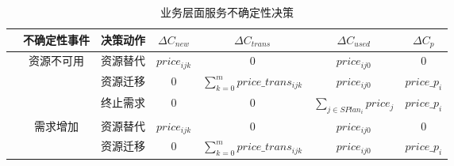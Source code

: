 \begin{table}[htbp]
    \caption{业务层面服务不确定性决策}
    \vspace{-0.5em}\label{table:state_action_business}\centering{}
    \begin{threeparttable}
        \begin{tabular}{lllllll}
            \toprule
            & \multicolumn{1}{c}{不确定性事件} 
            & \multicolumn{1}{c}{{决策动作}} 
            & \multicolumn{1}{c}{$\Delta C_{new}$} 
            & \multicolumn{1}{c}{$\Delta C_{trans}$} 
            & \multicolumn{1}{c}{$\Delta C_{used}$} 
            & \multicolumn{1}{c}{$\Delta C_{p}$} \\
            \hline

            & \multicolumn{1}{c}{资源不可用} 
            & \multicolumn{1}{c}{资源替代} 
            & \multicolumn{1}{c}{$price_{ijk}$\tnote{1}} 
            & \multicolumn{1}{c}{0} 
            & \multicolumn{1}{c}{$price_{ij0}$\tnote{2}} 
            & \multicolumn{1}{c}{0} \\
            
            & \multicolumn{1}{c}{} 
            & \multicolumn{1}{c}{资源迁移} 
            & \multicolumn{1}{c}{0} 
            & \multicolumn{1}{c}{$\sum\limits_{k = 0}^m {price\_tran{s_{ijk}}}$ \tnote{3}}
            & \multicolumn{1}{c}{$price_{ij0}$}
            & \multicolumn{1}{c}{$price\_p_i$ \tnote{4}} \\
            
            & \multicolumn{1}{c}{} 
            & \multicolumn{1}{c}{终止需求} 
            & \multicolumn{1}{c}{0} 
            & \multicolumn{1}{c}{0} 
            & \multicolumn{1}{c}{$\sum\limits_{j \in SPla{n_i}} {pric{e_j}}$\tnote{5}} 
            & \multicolumn{1}{c}{$price\_p_i$} \\
            
            & \multicolumn{1}{c}{需求增加} 
            & \multicolumn{1}{c}{资源替代} 
            & \multicolumn{1}{c}{$price_{ijk}$} 
            & \multicolumn{1}{c}{0} 
            & \multicolumn{1}{c}{$price_{ij0}$} 
            & \multicolumn{1}{c}{0} \\
            
            & \multicolumn{1}{c}{} 
            & \multicolumn{1}{c}{资源迁移} 
            & \multicolumn{1}{c}{0} 
            & \multicolumn{1}{c}{$\sum\limits_{k = 0}^m {price\_tran{s_{ijk}}}$}
            & \multicolumn{1}{c}{$price_{ij0}$}
            & \multicolumn{1}{c}{$price\_p_i$} \\
            

\end{tabular}
\end{threeparttable}
\end{table}
